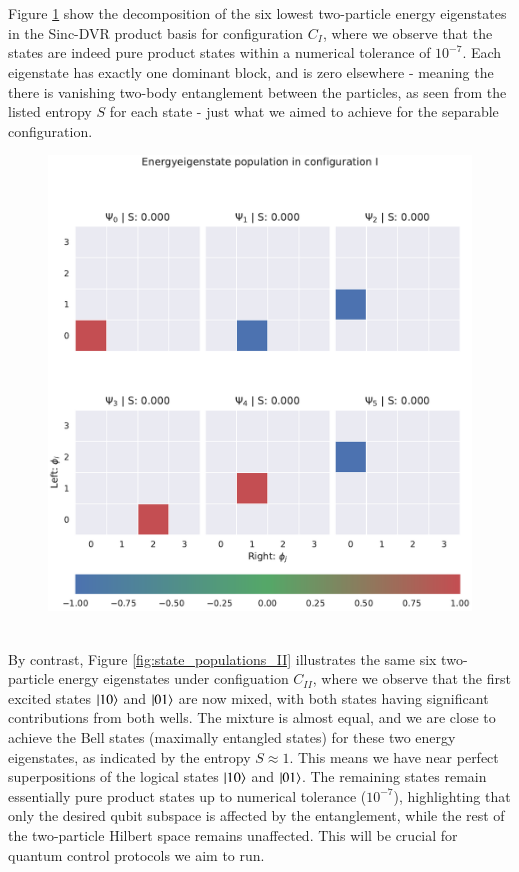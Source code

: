 \documentclass{subfiles}
\begin{document}
\\ \\ Figure \ref{fig:state_populations_I} show the decomposition of the six lowest two-particle energy eigenstates in the Sinc-DVR product basis for configuration $C_I$, where we observe that the states are indeed pure product states within a numerical tolerance of $10^{-7}$. Each eigenstate has exactly one dominant block, and is zero elsewhere - meaning the there is vanishing two-body entanglement between the particles, as seen from the listed entropy $S$ for each state - just what we aimed to achieve for the separable configuration. 
\begin{figure}[h!]
    \centering
    \includegraphics[width=1.0\textwidth]{figs/state_populations_I.pdf}
    \label{fig:state_populations_I}
\end{figure}


\\

By contrast, Figure \ref{fig:state_populations_II} illustrates the same six two-particle energy eigenstates under configuation $C_{II}$, where we observe that the first excited states $\ket{10}$ and $\ket{01}$ are now mixed, with both states having significant contributions from both wells. The mixture is almost equal, and we are close to achieve the Bell states (maximally entangled states) for these two energy eigenstates, as indicated by the entropy $S \approx 1$. This means we have near perfect superpositions of the logical states $\ket{10}$ and $\ket{01}$. The remaining states remain essentially pure product states up to numerical tolerance ($10^{-7}$), highlighting that only the desired qubit subspace is affected by the entanglement, while the rest of the two-particle Hilbert space remains unaffected. This will be crucial for quantum control protocols we aim to run.
\end{document}
